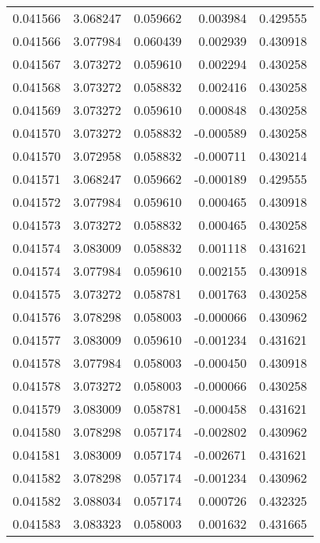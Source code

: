 \begin{tabular}{lrrrr}
0.041566    &  3.068247 &  0.059662 &  0.003984 &             0.429555 \\
0.041566    &  3.077984 &  0.060439 &  0.002939 &             0.430918 \\
0.041567    &  3.073272 &  0.059610 &  0.002294 &             0.430258 \\
0.041568    &  3.073272 &  0.058832 &  0.002416 &             0.430258 \\
0.041569    &  3.073272 &  0.059610 &  0.000848 &             0.430258 \\
0.041570    &  3.073272 &  0.058832 & -0.000589 &             0.430258 \\
0.041570    &  3.072958 &  0.058832 & -0.000711 &             0.430214 \\
0.041571    &  3.068247 &  0.059662 & -0.000189 &             0.429555 \\
0.041572    &  3.077984 &  0.059610 &  0.000465 &             0.430918 \\
0.041573    &  3.073272 &  0.058832 &  0.000465 &             0.430258 \\
0.041574    &  3.083009 &  0.058832 &  0.001118 &             0.431621 \\
0.041574    &  3.077984 &  0.059610 &  0.002155 &             0.430918 \\
0.041575    &  3.073272 &  0.058781 &  0.001763 &             0.430258 \\
0.041576    &  3.078298 &  0.058003 & -0.000066 &             0.430962 \\
0.041577    &  3.083009 &  0.059610 & -0.001234 &             0.431621 \\
0.041578    &  3.077984 &  0.058003 & -0.000450 &             0.430918 \\
0.041578    &  3.073272 &  0.058003 & -0.000066 &             0.430258 \\
0.041579    &  3.083009 &  0.058781 & -0.000458 &             0.431621 \\
0.041580    &  3.078298 &  0.057174 & -0.002802 &             0.430962 \\
0.041581    &  3.083009 &  0.057174 & -0.002671 &             0.431621 \\
0.041582    &  3.078298 &  0.057174 & -0.001234 &             0.430962 \\
0.041582    &  3.088034 &  0.057174 &  0.000726 &             0.432325 \\
0.041583    &  3.083323 &  0.058003 &  0.001632 &             0.431665 \\

\end{tabular}
